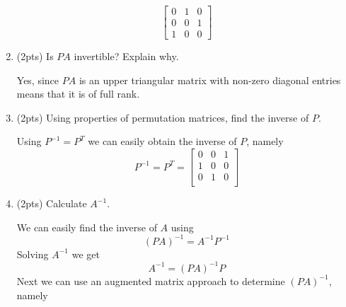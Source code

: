 \begin{enumerate}[label=(\alph*)]
\begin{mdframed}[style=MyFrame]
\begin{equation}
                \begin{bmatrix}
                    0       &       1       &       0       \\
                    0       &       0       &       1       \\
                    1       &       0       &       0       
                \end{bmatrix}
            \end{equation}
        \end{mdframed}
    \item (2pts) Is $PA$ invertible? Explain why.
        \begin{mdframed}[style=MyFrame]
            Yes, since $PA$ is an upper triangular matrix with non-zero
            diagonal entries means that it is of full rank.
        \end{mdframed}
    \item (2pts) Using properties of permutation matrices, find the inverse
        of $P$.
        \begin{mdframed}[style=MyFrame]
            Using $P^{-1}=P^{T}$ we can easily obtain the inverse of $P$,
            namely 
            \begin{equation}
                P^{-1} = P^{T} = 
                \begin{bmatrix}
                    0       &       0       &       1       \\
                    1       &       0       &       0       \\
                    0       &       1       &       0       \\
                \end{bmatrix}
            \end{equation}
        \end{mdframed}
    \item (2pts) Calculate $A^{-1}$.
        \begin{mdframed}[style=MyFrame]
            We can easily find the inverse of $A$ using 
            \begin{equation}
                \left(PA\right)^{-1} = A^{-1} P^{-1}
            \end{equation}
            Solving $A^{-1}$ we get 
            \begin{equation}
                A^{-1} = \left(PA\right)^{-1}P
            \end{equation}
            Next we can use an augmented matrix approach to determine
            $(PA)^{-1}$, namely

\end{mdframed}
\end{enumerate}
